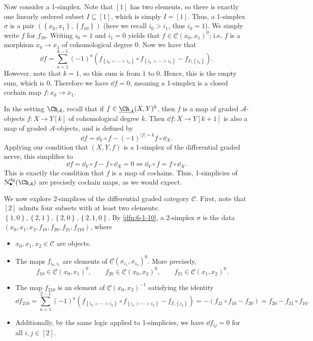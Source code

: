 Now consider a 1-simplex. Note that $[1]$ has two elements, so there is exactly one linearly ordered subset $I\subseteq [1]$, which is simply $I=[1]$. Thus, a 1-simplex $\sigma $ is a pair $(\left\{ x_0,x_1 \right\} ,\left\{ f_{10}  \right\} )$ (here we recall $i_0 > i_1$, thus $i_0 = 1$). We simply write $f$ for $f_{10} $. Writing $i_0 = 1$ and $i_1 = 0$ yields that $f \in \underline{\mathcal{C} } (x_0, x_1)^{0} $; i.e. $f$ is a morphism $x_0 \to x_1$ of cohomological degree 0. Now we have that
\[
	\dd f = \sum_{a=1}^{k-1} (-1)^{a} \left( f_{\left\{ i_0 > \cdots > i_a \right\} } \circ f_{\left\{ i_a > \cdots > i_k \right\}} - f_{I\setminus \left\{ i_a \right\} }  \right) 
.\]
However, note that $k=1$, so this sum is from $1$ to $0$. Hence, this is the empty sum, which is 0. Therefore we have $\dd f = 0$, meaning a 1-simplex is a closed cochain map $f : x_0 \to x_1$.

In the setting $\Ch_{\mathcal{A} } $, recall that if $f\in \underline{\Ch}_{\mathcal{A} } (X,Y)^k$, then $f$ is a map of graded $\mathcal{A} $-objects $f : X \to Y[k]$ of cohomological degree $k$. Then $\dd f : X \to Y[k+1]$ is also a map of graded $\mathcal{A} $-objects, and is defined by
\[
	\dd f = \dd_Y \circ f - (-1)^{\left| f \right|=k} f\circ \dd _X
.\]
Applying our condition that $(X,Y,f)$ is a 1-simplex of the differential graded nerve, this simplifies to
\[
	\dd f = \dd _Y \circ f - f\circ \dd _X = 0 \iff \dd _Y \circ f = f\circ \dd _X
.\]
This is exactly the condition that $f$ is a map of cochains. Thus, 1-simplicies of $\mathrm{N} ^{\mathrm{dg} } _{\bullet} (\Ch_{\mathcal{A} } )$ are precisely cochain maps, as we would expect.

We now explore 2-simplices of the differential graded category $\mathcal{C} $. First, note that $[2]$ admits four subsets with at least two elements: $\left\{ 1,0 \right\} ,\left\{ 2,1 \right\} ,\left\{ 2,0 \right\} ,\left\{ 2,1,0 \right\} $. By \cref{dfn:6-1-10}, a 2-simplex $\sigma$ is the data $(x_0,x_1,x_2,f_{10} ,f_{20} ,f_{21} ,f_{210} )$, where
\begin{itemize}
	\item $x_0,x_1,x_2\in \mathcal{C} $ are objects.
	\item The maps $f_{i_0,i_1}$ are elements of $\underline{\mathcal{C} } (x_{i_1} ,x_{i_0} )^0$. More precisely,
		\[
			f_{10} \in \underline{\mathcal{C} } (x_0,x_1)^0,\qquad f_{20} \in \underline{\mathcal{C} } (x_0,x_2)^0,\qquad f_{21} \in \underline{\mathcal{C} } (x_1,x_2)^0
		.\]
	\item The map $f_{210} $ is an element of $\underline{\mathcal{C} } (x_0,x_2)^{-1}$ satisfying the identity
		\[
			\dd f_{210} =\sum_{a=1}^{2-1} (-1)^{a} \left( f_{\left\{i_0 > \cdots > i_a\right\}} \circ f_{\left\{ i_a > \cdots > i_k \right\} } -f_{I \setminus \left\{ i_a \right\} }  \right) = -\left( f_{21} \circ f_{10} -f_{20}  \right) =f_{20} -f_{21} \circ f_{10} 
		.\]
	\item Additionally, by the same logic applied to 1-simplicies, we have $\dd f_{ij} =0$ for all $i,j\in[2]$.
\end{itemize}

